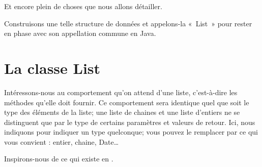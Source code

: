 Et encore plein de choses que nous allons détailler.

Construisons une telle structure de données et appelons-la «~List~»
pour rester en phase avec son appellation commune en Java.

\newpage
\section{La classe List}

Intéressons-nous au comportement qu’on attend d'une liste,
c'est-à-dire les méthodes qu’elle doit fournir.
Ce comportement sera identique quel que soit le type des éléments
de la liste; une liste de chaines et une liste d'entiers
ne se distinguent que par le type de certains paramètres
et valeurs de retour.
Ici, nous indiquons  pour indiquer un type quelconque;
vous pouvez le remplacer par ce qui vous convient :
entier, chaine, Date\dots

Inspirons-nous de ce qui existe en .

\begin{algo}
	\;
\end{algo}

